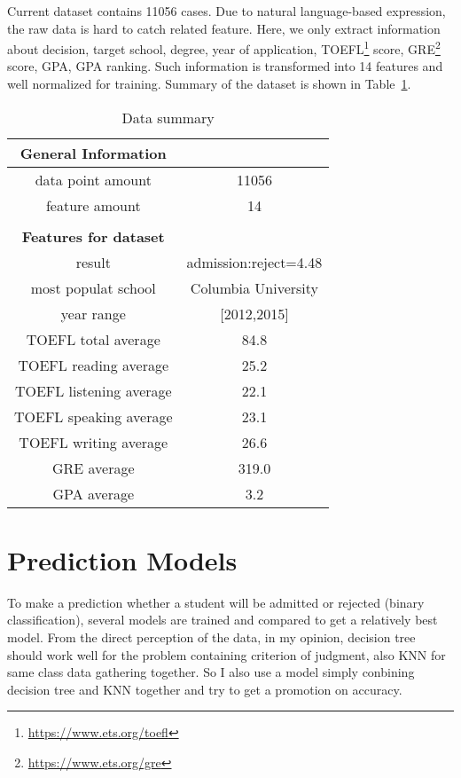 \documentclass{article}
\begin{document}
Current dataset contains 11056 cases. Due to natural language-based expression, the raw data is hard to catch related feature. Here, we only extract information about decision, target school, degree, year of application, TOEFL\footnote{\url{https://www.ets.org/toefl}} score, GRE\footnote{\url{https://www.ets.org/gre}} score, GPA, GPA ranking. Such information is transformed into 14 features and well normalized for training. Summary of the dataset is shown in Table~\ref{tab: Data_summary}.

\begin{table}[htbp]

\centering
    \begin{tabular}{cc}
        \textbf{General Information}\\
        \hline
        data point amount & 11056\\
        feature amount & 14\\
        \hline\\
        \textbf{Features for dataset}\\
        \hline
        result & admission:reject=4.48\\
        most populat school & Columbia University\\
        year range & [2012,2015]\\
        TOEFL total average & 84.8\\
        TOEFL reading average & 25.2\\
        TOEFL listening average & 22.1\\
        TOEFL speaking average & 23.1\\
        TOEFL writing average & 26.6\\
        GRE average & 319.0\\
        GPA average & 3.2\\
        \hline
    \end{tabular}

\caption{Data summary}
\label{tab: Data_summary}
\end{table}

\section{Prediction Models}

To make a prediction whether a student will be admitted or rejected (binary classification), several models are trained and compared to get a relatively best model. From the direct perception of the data, in my opinion, decision tree should work well for the problem containing criterion of judgment, also KNN for same class data gathering together. So I also use a model simply conbining decision tree and KNN together and try to get a promotion on accuracy.




\end{document}
